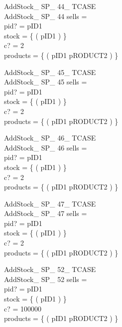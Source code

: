 \documentclass[fleqn,colorlinks,linkcolor=blue,citecolor=blue,urlcolor=blue]{article}
\newcommand{\negate}[0]{-}
\begin{document}
\begin{multicols}{2}
\begin{schema}{AddStock\_ SP\_ 44\_ TCASE}\\
 AddStock\_ SP\_ 44
\where
 sells =~\emptyset \\
 pid? = pID1 \\
 stock = \{ ( pID1  ) \} \\
 c? = 2 \\
 products = \{ ( pID1 \mapsto pRODUCT2 ) \}
\end{schema}


\begin{schema}{AddStock\_ SP\_ 45\_ TCASE}\\
 AddStock\_ SP\_ 45
\where
 sells =~\emptyset \\
 pid? = pID1 \\
 stock = \{ ( pID1  ) \} \\
 c? = 2 \\
 products = \{ ( pID1 \mapsto pRODUCT2 ) \}
\end{schema}


\begin{schema}{AddStock\_ SP\_ 46\_ TCASE}\\
 AddStock\_ SP\_ 46
\where
 sells =~\emptyset \\
 pid? = pID1 \\
 stock = \{ ( pID1  ) \} \\
 c? = 2 \\
 products = \{ ( pID1 \mapsto pRODUCT2 ) \}
\end{schema}


\begin{schema}{AddStock\_ SP\_ 47\_ TCASE}\\
 AddStock\_ SP\_ 47
\where
 sells =~\emptyset \\
 pid? = pID1 \\
 stock = \{ ( pID1  ) \} \\
 c? = 2 \\
 products = \{ ( pID1 \mapsto pRODUCT2 ) \}
\end{schema}


\begin{schema}{AddStock\_ SP\_ 52\_ TCASE}\\
 AddStock\_ SP\_ 52
\where
 sells =~\emptyset \\
 pid? = pID1 \\
 stock = \{ ( pID1 \mapsto \negate 4294967296 ) \} \\
 c? = 100000 \\
 products = \{ ( pID1 \mapsto pRODUCT2 ) \}
\end{schema}



\end{multicols}
\end{document}
